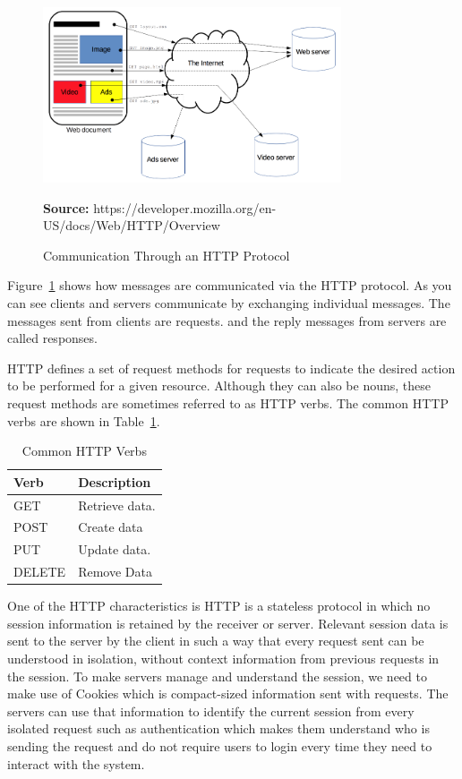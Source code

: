 \documentclass[12pt,oneside,openright,a4paper]{cpe-english-project}
\newcommand*{\captionsource}[2]{%
  \caption[{#1}]{#1}\vspace{-8pt}
  \textbf{Source:} #2}
\begin{document}
\begin{figure}[H]\centering
\includegraphics[width=250pt]{./images/2http.png}
\captionsource{Communication Through an HTTP Protocol}{https://developer.mozilla.org/en-US/docs/Web/HTTP/Overview}
\label{fig:2http}
\end{figure}\vspace{-24pt}
\vspace{1em}

Figure~\ref{fig:2http} shows how messages are communicated via the HTTP protocol. As you can see clients and servers communicate by exchanging individual messages. \cite{AnoverviewofHTTP} The messages sent from clients are requests. and the reply messages from servers are called responses.

HTTP defines a set of request methods for requests to indicate the desired action to be performed for a given resource. Although they can also be nouns, these request methods are sometimes referred to as HTTP verbs. \cite{HTTPrequestmethods} The common HTTP verbs are shown in Table~\ref{tbl:2CommonHTTPVerbs}.

\begin{table}[H]
\caption{Common HTTP Verbs}\label{tbl:2CommonHTTPVerbs}
\begin{tabularx}{\textwidth}{l|l} \hline\hline
Verb & Description \\ \hline\hline
GET & Retrieve data. \\ \hline
POST & Create data \\ \hline
PUT & Update data. \\ \hline
DELETE & Remove Data \\ \hline\hline
\end{tabularx}
\end{table}

One of the HTTP characteristics is HTTP is a stateless protocol in which no session information is retained by the receiver or server. Relevant session data is sent to the server by the client in such a way that every request sent can be understood in isolation, without context information from previous requests in the session. \cite{Statelessprotocol} To make servers manage and understand the session, we need to make use of Cookies which is compact-sized information sent with requests. The servers can use that information to identify the current session from every isolated request such as authentication which makes them understand who is sending the request and do not require users to login every time they need to interact with the system.
\end{document}
